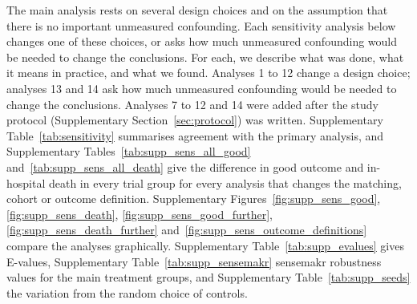 The main analysis rests on several design choices and on the assumption that there is no important unmeasured confounding. Each sensitivity analysis below changes one of these choices, or asks how much unmeasured confounding would be needed to change the conclusions. For each, we describe what was done, what it means in practice, and what we found. Analyses 1 to 12 change a design choice; analyses 13 and 14 ask how much unmeasured confounding would be needed to change the conclusions. Analyses 7 to 12 and 14 were added after the study protocol (Supplementary Section~\ref{sec:protocol}) was written. Supplementary Table~\ref{tab:sensitivity} summarises agreement with the primary analysis, and Supplementary Tables~\ref{tab:supp_sens_all_good} and~\ref{tab:supp_sens_all_death} give the difference in good outcome and in-hospital death in every trial group for every analysis that changes the matching, cohort or outcome definition. Supplementary Figures~\ref{fig:supp_sens_good}, \ref{fig:supp_sens_death}, \ref{fig:supp_sens_good_further}, \ref{fig:supp_sens_death_further} and~\ref{fig:supp_sens_outcome_definitions} compare the analyses graphically. Supplementary Table~\ref{tab:supp_evalues} gives E-values, Supplementary Table~\ref{tab:supp_sensemakr} sensemakr robustness values for the main treatment groups, and Supplementary Table~\ref{tab:supp_seeds} the variation from the random choice of controls.

